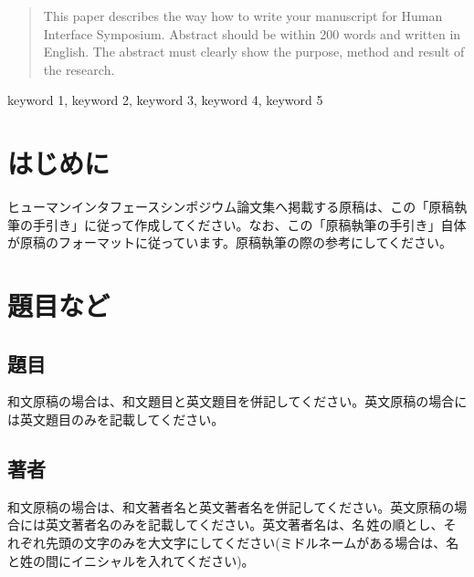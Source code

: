 \documentclass{hissymp}
\begin{document}

\begin{abstract}
This paper describes the way how to write your manuscript for Human Interface Symposium. Abstract should be within 200 words and written in English. The abstract must clearly show the purpose, method and result of the research.
\end{abstract}

\begin{keyword}	
keyword 1, keyword 2, keyword 3, keyword 4, keyword 5
\end{keyword}

\maketitle	

\section{はじめに}
ヒューマンインタフェースシンポジウム論文集へ掲載する原稿は、この「原稿執筆の手引き」に従って作成してください。なお、この「原稿執筆の手引き」自体が原稿のフォーマットに従っています。原稿執筆の際の参考にしてください。


\section{題目など}

\subsection{題目}
和文原稿の場合は、和文題目と英文題目を併記してください。英文原稿の場合には英文題目のみを記載してください。

\subsection{著者}
和文原稿の場合は、和文著者名と英文著者名を併記してください。英文原稿の場合には英文著者名のみを記載してください。英文著者名は、名\,姓の順とし、それぞれ先頭の文字のみを大文字にしてください(ミドルネームがある場合は、名と姓の間にイニシャルを入れてください)。
\end{document}
